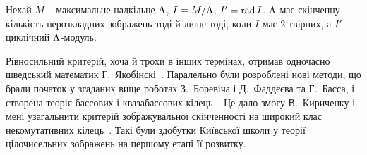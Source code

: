 \begin{theorem}
Нехай $M$ -- максимальне надкільце $\Lambda$, $I=M/\Lambda$, $I'=\mathop\mathrm{rad}\nolimits I$. 
$\Lambda$ має скінченну кількість нерозкладних зображень тоді й лише тоді, коли  $I$ має $2$ твірних, а $I'$ -- циклічний $\Lambda$-модуль.
\end{theorem}
Рівносильний критерій, хоча й трохи в інших термінах, отримав одночасно шведський математик Г.~Якобінскі~\cite{Jac-fin}.
Паралельно були розроблені нові методи, що брали початок у згаданих вище роботах З.~Боревіча і Д.~Фаддєєва та  Г.~Басса, і створена теорія бассових і квазабассових кілець~\cite{DKR,qbass}. 
Це дало змогу В.~Кириченку і мені узагальнити критерій зображувальної скінченності на широкий клас некомутативних кілець~\cite{primary}. 
Такі були здобутки Київської школи у теорії цілочисельних зображень на першому етапі її розвитку.


